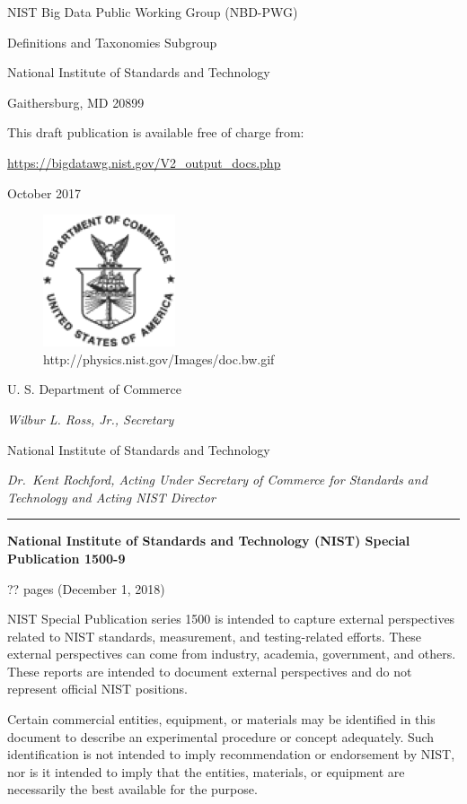 \documentclass[9pt,]{article}
\begin{document}
NIST Big Data Public Working Group (NBD-PWG)

Definitions and Taxonomies Subgroup

National Institute of Standards and Technology

Gaithersburg, MD 20899

This draft publication is available free of charge from:

\url{https://bigdatawg.nist.gov/V2_output_docs.php}

October 2017

\begin{figure}
\centering
\includegraphics{images/us-dept-of-com.png}
\caption{http://physics.nist.gov/Images/doc.bw.gif}
\end{figure}

U. S. Department of Commerce

\emph{Wilbur L. Ross, Jr., Secretary}

National Institute of Standards and Technology

\emph{Dr.~Kent Rochford, Acting Under Secretary of Commerce for
Standards and Technology and Acting NIST Director}

\begin{center}\rule{0.5\linewidth}{\linethickness}\end{center}

\textbf{National Institute of Standards and Technology (NIST) Special
Publication 1500-9}

?? pages (December 1, 2018)

NIST Special Publication series 1500 is intended to capture external
perspectives related to NIST standards, measurement, and testing-related
efforts. These external perspectives can come from industry, academia,
government, and others. These reports are intended to document external
perspectives and do not represent official NIST positions.

Certain commercial entities, equipment, or materials may be identified
in this document to describe an experimental procedure or concept
adequately. Such identification is not intended to imply recommendation
or endorsement by NIST, nor is it intended to imply that the entities,
materials, or equipment are necessarily the best available for the
purpose.
\end{document}
